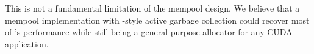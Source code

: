 This is not a fundamental limitation of the mempool design.
We believe that a mempool implementation with {\uvmname}-style active garbage collection could recover most of {\uvmname}'s performance
    while still being a general-purpose allocator for any CUDA application.
